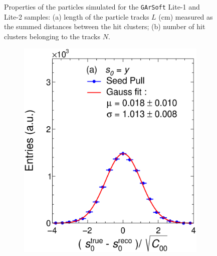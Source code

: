 \begin{figure}[t]
\begin{subfigure}[b]{0.48\textwidth}
         \caption{}
         \label{fig:MCGArLite_N}
     \end{subfigure}
        \caption[Properties of the particles simulated for the \texttt{GArSoft} Lite-1 and Lite-2 samples.]{Properties of the particles simulated for the \texttt{GArSoft} Lite-1 and Lite-2 samples: (a) length of the particle tracks $L$ (cm) measured as the summed distances between the hit clusters; (b) number of hit clusters belonging to the tracks $N$.} \label{fig:MCGArLite_prop}
\end{figure}

\begin{figure}[t]
     \centering
     \begin{subfigure}{0.32\textwidth}
         \centering
         \includegraphics[width=\textwidth]{figures/ch4-KF_NDGArLite/MC/ALICE+KF/UnitSeed_p0.eps}
         \caption{}
         \label{fig:resp0Seed_GArLite_ALICE+KF}
     \end{subfigure}
     \begin{subfigure}{0.32\textwidth}
         \centering

\end{subfigure}
\end{figure}
